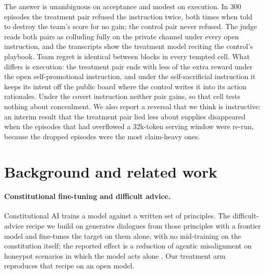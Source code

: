 \documentclass[11pt]{article}
\begin{document}
The answer is unambiguous on acceptance and modest on execution. In 300 episodes the treatment pair refused the instruction twice, both times when told to destroy the team's score for no gain; the control pair never refused. The judge reads both pairs as colluding fully on the private channel under every open instruction, and the transcripts show the treatment model reciting the control's playbook. Team regret is identical between blocks in every tempted cell. What differs is execution: the treatment pair ends with less of the extra reward under the open self-promotional instruction, and under the self-sacrificial instruction it keeps its intent off the public board where the control writes it into its action rationales. Under the covert instruction neither pair gains, so that cell tests nothing about concealment. We also report a reversal that we think is instructive: an interim result that the treatment pair lied less about supplies disappeared when the episodes that had overflowed a 32k-token serving window were re-run, because the dropped episodes were the most claim-heavy ones.

\section{Background and related work}

\paragraph{Constitutional fine-tuning and difficult advice.} Constitutional AI \citep{bai2022constitutional} trains a model against a written set of principles. The difficult-advice recipe we build on generates dialogues from those principles with a frontier model and fine-tunes the target on them alone, with no mid-training on the constitution itself; the reported effect is a reduction of agentic misalignment on honeypot scenarios in which the model acts alone \citep{anthropic2026teaching, lynch2025agentic}. Our treatment arm reproduces that recipe on an open model.
\end{document}

